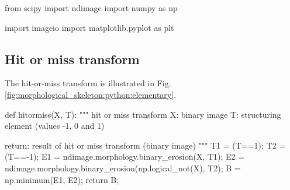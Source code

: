 \def\QRCODE{TB_IPR_TUT.IMG.binary_morphological_skeletonization_pythonqrcode.png}
\def\QRPAGE{http://www.iptutorials.science/tree/master/TB_IPR/TUT.IMG.binary_morphological_skeletonization/python}

\begin{python}
from scipy import ndimage
import numpy as np

import imageio
import matplotlib.pyplot as plt
\end{python}

\subsection{Hit or miss transform}

The hit-or-miss transform is illustrated in Fig.\ref{fig:morphological_skeleton:python:elementary}. 
\begin{python}
def hitormiss(X, T):
    """
    hit or miss transform
    X: binary image
    T: structuring element (values -1, 0 and 1)
    
    return: result of hit or miss transform (binary image)
    """
    T1 = (T==1);
    T2 = (T==-1);
    E1 = ndimage.morphology.binary_erosion(X, T1);
    E2 = ndimage.morphology.binary_erosion(np.logical_not(X), T2);
    B = np.minimum(E1, E2);
    return B;

\end{python}

